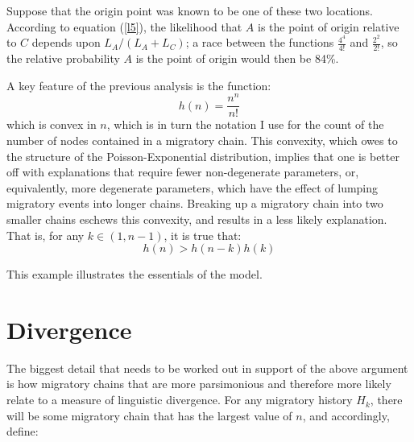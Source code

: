 \documentclass[11pt]{article}
\begin{document}
Suppose that the origin point was known to be one of these two locations. According to equation (\ref{l5}), the likelihood that $A$ is the point of origin relative to $C$ depends upon $L_{A} /(L_A+L_C)$; a race between the functions $\frac{4^4}{4!}$ and $\frac{2^2}{2!}$, so the relative probability  $A$ is the point of origin would then be 84\%. 

A key feature of the previous analysis is the function: 
\begin{equation*}
h(n)=\frac{n^n}{n!}
\end{equation*}
which is convex in $n$, which is in turn the notation I use for the count of the number of nodes contained in a migratory chain. This convexity, which owes to the structure of the Poisson-Exponential distribution, implies that one is better off with explanations that require fewer non-degenerate parameters, or, equivalently, more degenerate parameters, which have the effect of lumping migratory events into longer chains. Breaking up a migratory chain into two smaller chains eschews this convexity, and results in a less likely explanation. That is, for any  $k \in (1,n-1)$, it is true that:
\begin{equation*}
h(n) > h(n-k)h(k)
\end{equation*} 

This example illustrates the essentials of the model. 

\section{Divergence}
The biggest detail that needs to be worked out in support of the above argument is how migratory chains that are more parsimonious and therefore more likely relate to a measure of linguistic divergence. For any migratory history $H_k$, there will be some migratory chain that has the largest value of $n$, and accordingly, define:
\end{document}
